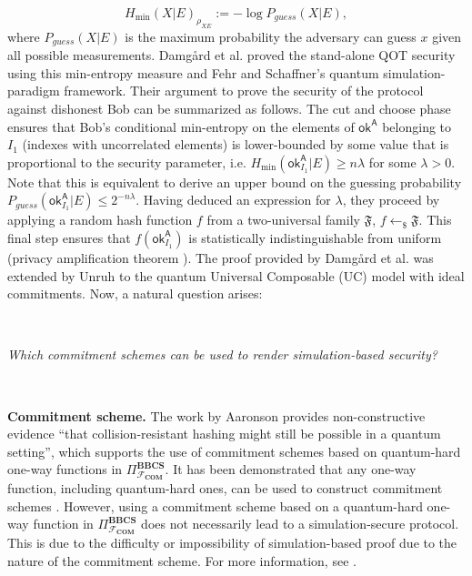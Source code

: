 $$H_{\text{min}}(X | E)_{\rho_{X E}} := -\log P_{guess}(X|E),$$ 
where $P_{guess}(X|E)$ is the maximum probability the adversary can guess $x$ given all possible measurements. Damg{\aa}rd et al. \cite{DFLSS09} proved the stand-alone QOT security using this min-entropy measure and Fehr and Schaffner's \cite{FS09} quantum simulation-paradigm framework. Their argument to prove the security of the protocol against dishonest Bob can be summarized as follows. The cut and choose phase ensures that Bob's conditional min-entropy on the elements of $\mathsf{ok}^{\mathsf{A}}$ belonging to $I_{1}$ (indexes with uncorrelated elements) is lower-bounded by some value that is proportional to the security parameter, i.e. $H_{\text{min}}(\mathsf{ok}^{\mathsf{A}}_{I_{1}} | E) \geq n\lambda$ for some $\lambda > 0$. Note that this is equivalent to derive an upper bound on the guessing probability $P_{guess}(\mathsf{ok}^{\mathsf{A}}_{I_{1}}|E) \leq 2^{-n\lambda}$. Having deduced an expression for $\lambda$, they proceed by applying a random hash function $f$ from a two-universal family $\mathfrak{F}$, $f\leftarrow_{\$}\mathfrak{F}$. This final step ensures that $f(\mathsf{ok}^{\mathsf{A}}_{I_{1}})$ is statistically indistinguishable from uniform (privacy amplification theorem \cite{DFRSS07, RK05, R05}). The proof provided by Damg{\aa}rd et al. \cite{DFLSS09} was extended by Unruh \cite{U10} to the quantum Universal Composable (UC) model with ideal commitments. Now, a natural question arises: 

\

\centerline{\textit{Which commitment schemes can be used to render simulation-based security?}}

\

\noindent\textbf{Commitment scheme.} The work by Aaronson \cite{A02} provides non-constructive evidence ``that collision-resistant hashing might still be possible in a quantum setting'', which supports the use of commitment schemes based on quantum-hard one-way functions in $\Pi^{\textbf{BBCS}}_{\mathcal{F}_{\textbf{COM}}}$. It has been demonstrated that any one-way function, including quantum-hard ones, can be used to construct commitment schemes \cite{N91, HILL99, HR07}. However, using a commitment scheme based on a quantum-hard one-way function in $\Pi^{\textbf{BBCS}}_{\mathcal{F}_{\textbf{COM}}}$ does not necessarily lead to a simulation-secure protocol. This is due to the difficulty or impossibility of simulation-based proof due to the nature of the commitment scheme. For more information, see \cite{GLSV21}.

